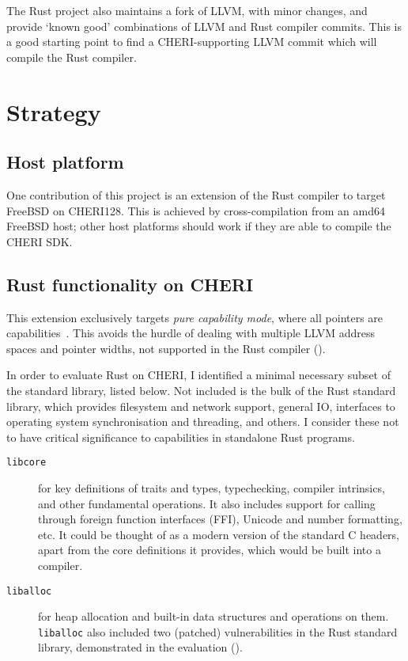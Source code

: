 \documentclass[dissertation.tex]{subfiles}
\begin{document}
The Rust project also maintains a fork of LLVM, with minor changes, and
provide `known good' combinations of LLVM and Rust compiler commits.
This is a good starting point to find a CHERI-supporting LLVM commit
which will compile the Rust compiler.


\section{Strategy}
\label{sec:impl-what}

\subsection{Host platform}
One contribution of this project is an extension of the Rust compiler to
target FreeBSD on CHERI128.
This is achieved by cross-compilation from an amd64 FreeBSD host; other
host platforms should work if they are able to compile the CHERI SDK.

\subsection{Rust functionality on CHERI}
This extension exclusively targets \emph{pure capability mode}, where
all pointers are capabilities~\cite{cheri-prog-guide}.
This avoids the hurdle of dealing with multiple LLVM address spaces and
pointer widths, not supported in the Rust compiler
().

In order to evaluate Rust on CHERI, I identified
a minimal necessary subset of the standard library, listed below.
Not included is the bulk of the Rust standard library, which provides
filesystem and network support, general IO, interfaces to operating
system synchronisation and threading, and others.
I consider these not to have critical significance to capabilities in
standalone Rust programs.

\begin{description}
    \item[\texttt{libcore}] for key definitions of traits and types,
    typechecking, compiler intrinsics, and other fundamental operations.
    It also includes support for calling through foreign function
    interfaces (FFI), Unicode and number formatting, etc.
    It could be thought of as a modern version of the standard C
    headers, apart from the core definitions it provides, which would be
    built into a compiler.
    \item[\texttt{liballoc}] for heap allocation and built-in data
    structures and operations on them.
    \texttt{liballoc} also included two (patched) vulnerabilities in the
    Rust standard library, demonstrated in the evaluation
    ().
\end{description}
\end{document}
